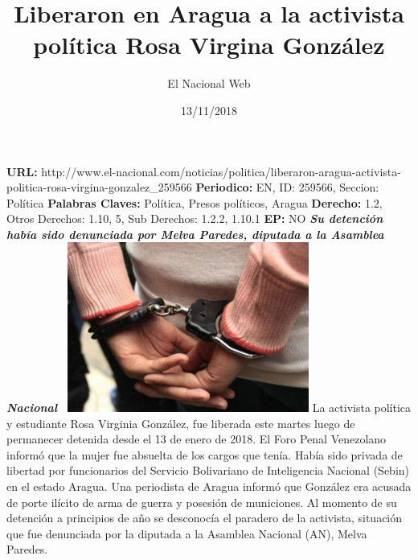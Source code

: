 \documentclass{article}%
\title{\textbf{Liberaron en Aragua a la activista política Rosa Virgina González}}%
\author{El Nacional Web}%
\date{13/11/2018}%
\begin{document}
%
\normalsize%
\maketitle%
\textbf{URL: }%
http://www.el{-}nacional.com/noticias/politica/liberaron{-}aragua{-}activista{-}politica{-}rosa{-}virgina{-}gonzalez\_259566\newline%
%
\textbf{Periodico: }%
EN, %
ID: %
259566, %
Seccion: %
Política\newline%
%
\textbf{Palabras Claves: }%
Política, Presos políticos, Aragua\newline%
%
\textbf{Derecho: }%
1.2, %
Otros Derechos: %
1.10, 5, %
Sub Derechos: %
1.2.2, 1.10.1\newline%
%
\textbf{EP: }%
NO\newline%
\newline%
%
\textbf{\textit{Su detención había sido denunciada por Melva Paredes, diputada a la Asamblea Nacional~}}%
\newline%
\newline%
%
\includegraphics[width=300px]{190.jpg}%
\newline%
%
La activista política y estudiante Rosa Virginia González, fue liberada este martes luego de permanecer detenida desde el 13 de enero de 2018.%
\newline%
%
El Foro Penal Venezolano informó que la mujer fue absuelta de los cargos que tenía. Había sido privada de libertad por funcionarios del Servicio Bolivariano de Inteligencia Nacional (Sebin) en el estado Aragua.%
\newline%
%
Una periodista de Aragua informó que González era acusada de porte ilícito de arma de guerra y posesión de municiones.%
\newline%
%
Al momento de su detención a principios de año se desconocía el paradero de la activista, situación que fue denunciada por la diputada a la Asamblea Nacional (AN), Melva Paredes.%
\newline%
%
\end{document}
